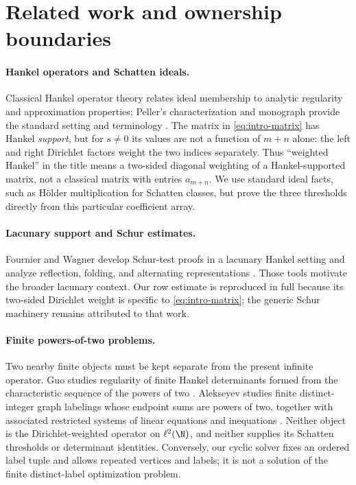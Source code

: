 \section{Related work and ownership boundaries}
\label{sec:related}

\paragraph{Hankel operators and Schatten ideals.}
Classical Hankel operator theory relates ideal membership to analytic
regularity and approximation properties; Peller's characterization and
monograph provide the standard setting and terminology
\citep{peller1985description,peller2003hankel}.  The matrix in
\cref{eq:intro-matrix} has Hankel \emph{support}, but for $s\ne0$ its values
are not a function of $m+n$ alone: the left and right Dirichlet factors
weight the two indices separately.  Thus ``weighted Hankel'' in the title
means a two-sided diagonal weighting of a Hankel-supported matrix, not a
classical matrix with entries $a_{m+n}$.  We use standard ideal facts, such as
H\"older multiplication for Schatten classes, but prove the three thresholds
directly from this particular coefficient array.

\paragraph{Lacunary support and Schur estimates.}
Fournier and Wagner develop Schur-test proofs in a lacunary Hankel setting
and analyze reflection, folding, and alternating representations
\citep{fournier2015paley}.  Those tools motivate the broader lacunary
context.  Our row estimate is reproduced in full because its two-sided
Dirichlet weight is specific to \cref{eq:intro-matrix}; the generic Schur
machinery remains attributed to that work.

\paragraph{Finite powers-of-two problems.}
Two nearby finite objects must be kept separate from the present infinite
operator.  Guo studies regularity of finite Hankel determinants formed from
the characteristic sequence of the powers of two
\citep{guo2019regularity}.  Alekseyev studies finite distinct-integer graph
labelings whose endpoint sums are powers of two, together with associated
restricted systems of linear equations and inequations
\citep{alekseyev2026maximizing}.  Neither object is the
Dirichlet-weighted operator on $\ell^2(\N)$, and neither supplies its
Schatten thresholds or determinant identities.  Conversely, our cyclic
solver fixes an ordered label tuple and allows repeated vertices and labels;
it is not a solution of the finite distinct-label optimization problem.

